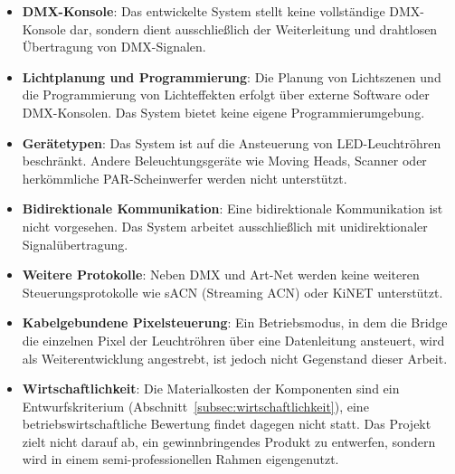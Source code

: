 \begin{itemize}
    \item \textbf{DMX-Konsole}: Das entwickelte System stellt keine vollständige DMX-Konsole dar, sondern dient ausschließlich der Weiterleitung und drahtlosen Übertragung von DMX-Signalen.
    
    \item \textbf{Lichtplanung und Programmierung}: Die Planung von Lichtszenen und die Programmierung von Lichteffekten erfolgt über externe Software oder DMX-Konsolen. Das System bietet keine eigene Programmierumgebung.
    
    \item \textbf{Gerätetypen}: Das System ist auf die Ansteuerung von LED-Leuchtröhren beschränkt. Andere Beleuchtungsgeräte wie Moving Heads, Scanner oder herkömmliche PAR-Scheinwerfer werden nicht unterstützt.
    
    \item \textbf{Bidirektionale Kommunikation}: Eine bidirektionale Kommunikation ist nicht vorgesehen. Das System arbeitet ausschließlich mit unidirektionaler Signalübertragung.
    
    \item \textbf{Weitere Protokolle}: Neben DMX und Art-Net werden keine weiteren Steuerungsprotokolle wie sACN (Streaming ACN) oder KiNET unterstützt.

    \item \textbf{Kabelgebundene Pixelsteuerung}: Ein Betriebsmodus, in dem die Bridge die
    einzelnen Pixel der Leuchtröhren über eine Datenleitung ansteuert, wird als
    Weiterentwicklung angestrebt, ist jedoch nicht Gegenstand dieser Arbeit.

    \item \textbf{Wirtschaftlichkeit}: Die Materialkosten der Komponenten sind ein
    Entwurfskriterium (Abschnitt~\ref{subsec:wirtschaftlichkeit}), eine
    betriebswirtschaftliche Bewertung findet dagegen nicht statt. Das Projekt zielt nicht
    darauf ab, ein gewinnbringendes Produkt zu entwerfen, sondern wird in einem
    semi-professionellen Rahmen eigengenutzt.
\end{itemize}